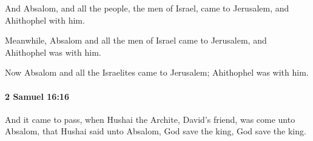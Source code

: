 			\begin{versebox}
					\item[BHS] 
					\item[ASV] And Absalom, and all the people, the men of Israel, came to Jerusalem, and Ahithophel with him.
					\item[NIV] Meanwhile, Absalom and all the men of Israel came to Jerusalem, and Ahithophel was with him.
					\item[NRSV] Now Absalom and all the Israelites came to Jerusalem; Ahithophel was with him.
			\end{versebox}

		\paragraph{2 Samuel 16:16} %
			\label{2SAMUEL-16-16}

			And it came to pass, when Hushai the Archite, David’s friend, was come unto Absalom, that Hushai said unto Absalom, God save the king, God save the king.


